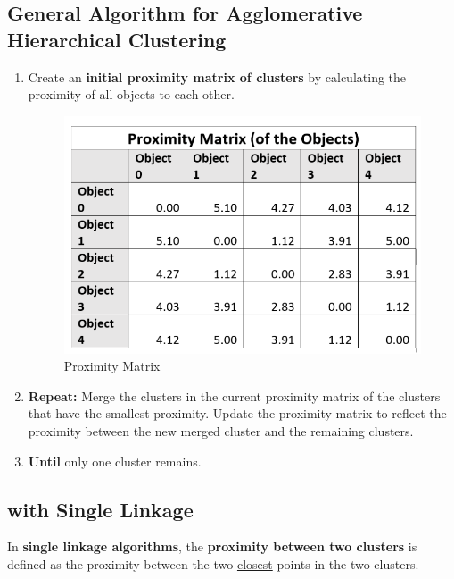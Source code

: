 \documentclass[11pt]{elegantbook}
\begin{document}
\subsection{General Algorithm for Agglomerative Hierarchical Clustering}
\begin{enumerate}[1.]
    \item Create an \textbf{initial proximity matrix of clusters} by calculating the proximity of all objects to each other.
    \begin{center}\begin{figure}[htbp]
        \centering
        \includegraphics[scale=0.25]{PM.png}
        \caption{Proximity Matrix}
        \label{}
    \end{figure}\end{center}
    \item \textbf{Repeat:}
    \subitem Merge the clusters in the current proximity matrix of the clusters that have the smallest proximity.
    \subitem Update the proximity matrix to reflect the proximity between the new merged cluster and the remaining clusters.
    \item \textbf{Until} only one cluster remains.
\end{enumerate}

\subsection{with Single Linkage}

In \textbf{single linkage algorithms}, the \textbf{proximity between two clusters} is defined as the proximity between the two \underline{closest} points in the two clusters.
\end{document}
